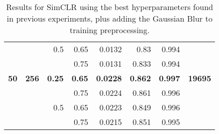 \begin{table}[H]
{\begin{tabular}{rrrrrrrr}
                  &              & 0.5           & 0.65          & 0.0132               & 0.83                    & 0.994                   &                \\
                  &              &               & 0.75          & 0.0131               & 0.833                   & 0.994                   &                \\
    \textbf{50}   & \textbf{256} & \textbf{0.25} & \textbf{0.65} & \textbf{0.0228}      & \textbf{0.862}          & \textbf{0.997}          & \textbf{19695} \\
                  &              &               & 0.75          & 0.0224               & 0.861                   & 0.996                   &                \\
                  &              & 0.5           & 0.65          & 0.0223               & 0.849                   & 0.996                   &                \\
                  &              &               & 0.75          & 0.0215               & 0.851                   & 0.995                   &               
    \end{tabular}
    }
    \caption{Results for SimCLR using the best hyperparameters found in previous experiments, plus adding the Gaussian Blur to training preprocessing.}
    \label{table:simclr:gridsearch:blur}
    \end{table}
